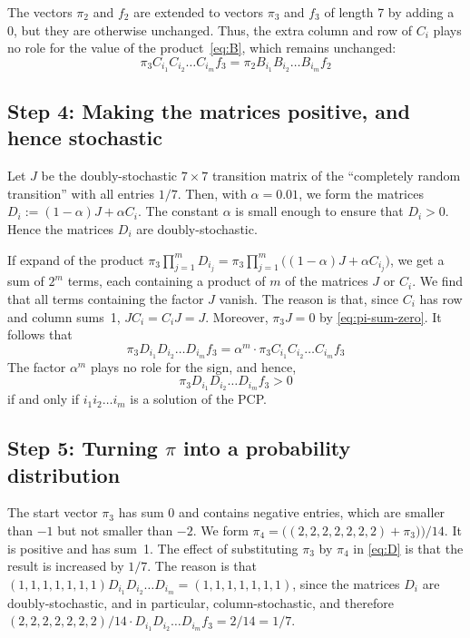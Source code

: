 \documentclass[a4paper,cleveref, autoref, thm-restate]{lipics-v2021}
\begin{document}
The vectors $\pi_2$ and $f_2$
are extended to vectors
$\pi_3$ and $f_3$
of length 7 by adding a 0, but
they are otherwise unchanged.  Thus, the extra column and row of $C_i$
plays no role for the value of the product~\eqref{eq:B}, which remains
unchanged:
\begin{displaymath}
  \pi_3C_{i_1}C_{i_2} \ldots C_{i_m}f_3
=    \pi_2B_{i_1}B_{i_2} \ldots B_{i_m}f_2
\end{displaymath}
\subsection{Step 4: Making the matrices positive, and hence
  stochastic}
\label{sec:step4}

Let $J$ be the doubly-stochastic $7\times 7$ transition matrix of
the ``completely random transition'' with all entries $1/7$.
%
Then, with %
$\alpha=0.01$,
we form the matrices $D_i := (1-\alpha)J + \alpha C_i$.
The constant $\alpha$ is small enough to ensure that $D_i>0$.
Hence the matrices $D_i$ are doubly-stochastic.

If expand of the product
$\pi_3\prod_{j=1}^m D_{i_j}=
\pi_3\prod_{j=1}^m \bigl((1-\alpha)J + \alpha C_{i_j}\bigr)$,
we get a sum of $2^m$ terms, each containing a
 product of $m$ of the matrices $J$ or $C_i$.
We find that all terms containing the factor $J$ vanish. 
The reason is that, 
since $C_i$ has row and column sums~1,
 $JC_i = C_iJ=J$. Moreover, $\pi_3 J=0$ by \eqref{eq:pi-sum-zero}.
It follows that
\begin{displaymath}
    \pi_3D_{i_1}D_{i_2} \ldots D_{i_m}f_3
=  \alpha^m \cdot \pi_3C_{i_1}C_{i_2} \ldots C_{i_m}f_3
\end{displaymath}
The factor $\alpha^m$ plays no role for the sign, and hence,
\begin{equation}
  \label{eq:D}
  \pi_3D_{i_1}D_{i_2} \ldots D_{i_m}f_3 >0  
\end{equation}
if and only if
$i_1i_2 \ldots i_m$ is a solution of the PCP.

\subsection{Step 5: Turning \texorpdfstring{$\pi$}{π} into a
  probability distribution}
\label{sec:step5}
The start vector $\pi_3$ has sum 0 and contains negative entries,
which
are smaller than $-1$ but not smaller than $-2$.
We form $\pi_4 = \bigl( (2,2,2,2,2,2,2)+\pi_3) \bigr)/14$.
It is positive and has sum~1.
The effect of substituting $\pi_3$ by $\pi_4$ in \eqref{eq:D} is that
the result is increased by $1/7$.
The reason is that
\begin{math}
  (1,1,1,1,1,1,1)
  D_{i_1}D_{i_2} \ldots D_{i_m} =   (1,1,1,1,1,1,1)
\end{math},
since the matrices $D_i$ are doubly-stochastic, and in particular,
column-stochastic,
and therefore 
\begin{math}
  (2,2,2,2,2,2,2)/14\cdot
  D_{i_1}D_{i_2} \ldots D_{i_m}f_3 = 2/14 = 1/7
\end{math}.
\end{document}

